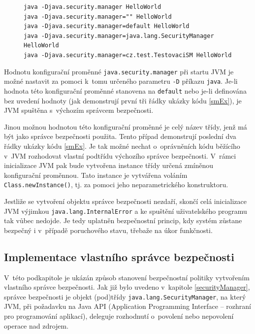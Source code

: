 \begin{figure}[tbh]
\begin{lstlisting}[caption=Příkazy spouštějící program s~výchozím správcem bezpečnosti, label=smEx]
java -Djava.security.manager HelloWorld
java -Djava.security.manager="" HelloWorld
java -Djava.security.manager=default HelloWorld
java -Djava.security.manager=java.lang.SecurityManager HelloWorld
java -Djava.security.manager=cz.test.TestovaciSM HelloWorld
\end{lstlisting}
\end{figure}

Hodnotu konfigurační proměnné {\tt java.security.manager} při startu JVM je možné nastavit za pomoci k~tomu určeného parametru {\tt -D} příkazu {\tt java}.
Je-li hodnota této konfigurační proměnné stanovena na {\tt default} nebo je-li definována bez uvedení hodnoty
(jak demonstrují první tři řádky ukázky kódu \ref{smEx}), je JVM spuštěna s~výchozím správcem bezpečnosti.
\cite{javaSecurityArch}

Jinou možnou hodnotou této konfigurační proměnné je celý název třídy, jenž má být jako správce bezpečnosti použita.
Tento případ demonstrují poslední dva řádky ukázky kódu \ref{smEx}.
Je tak možné nechat o~oprávněních kódu běžícího v~JVM rozhodovat vlastní podtřídu výchozího správce bezpečnosti.
V~rámci inicializace JVM pak bude vytvořena instance třídy určená zmíněnou konfigurační proměnnou.
Tato instance je vytvářena voláním {\tt Class.newInstance()}, tj. za pomoci jeho neparametrického konstruktoru.

Jestliže se vytvoření objektu správce bezpečnosti nezdaří, skončí celá inicializace JVM výjimkou {\tt java.lang.InternalError} \cite{sourceLauncher} a ke spuštění uživatelského programu tak vůbec nedojde.
Je tedy uplatněn bezpečnostní princip, kdy systém zůstane bezpečný i v~případě poruchového stavu, třebaže na úkor funkčnosti.

\subsection{Implementace vlastního správce bezpečnosti} \label{vlastniSM}

V~této podkapitole je ukázán způsob stanovení bezpečnostní politiky vytvořením vlastního správce bezpečnosti.
Jak již bylo uvedeno v~kapitole \ref{securityManager}, správce bezpečnosti je objekt (pod)třídy {\tt java.lang.SecurityManager},
na který JVM, při požadavku na Java API (Application Programming Interface -- rozhraní pro programování aplikací), deleguje rozhodnutí o~povolení nebo nepovolení operace nad zdrojem.


